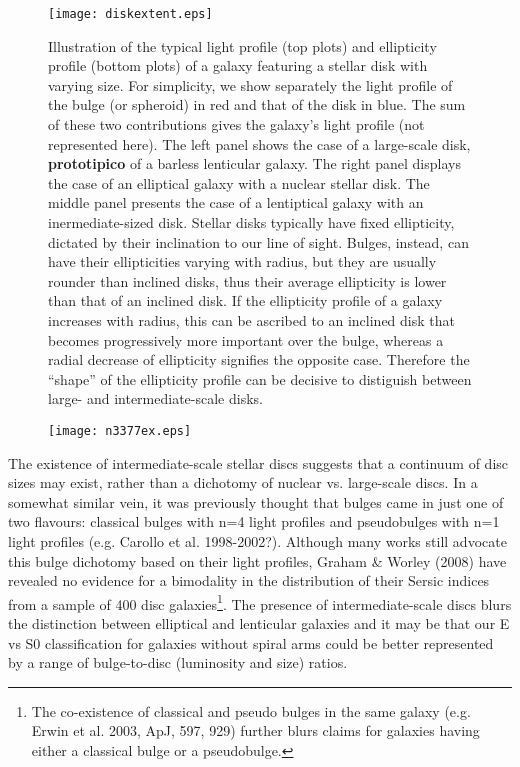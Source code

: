 \documentclass[preprint2]{emulateapj}
\begin{document}
\begin{figure}
\texttt{[image: diskextent.eps]}
\caption{Illustration of the typical light profile (top plots) and ellipticity profile (bottom plots) of a galaxy 
featuring a stellar disk with varying size. 
For simplicity, we show separately the light profile of the bulge (or spheroid) in red 
and that of the disk in blue. 
The sum of these two contributions gives the galaxy's light profile (not represented here).
The left panel shows the case of a large-scale disk, {\bf prototipico} of a barless lenticular galaxy. 
The right panel displays the case of an elliptical galaxy with a nuclear stellar disk. 
The middle panel presents the case of a lentiptical galaxy with an inermediate-sized disk. 
Stellar disks typically have fixed ellipticity, dictated by their inclination to our line of sight.
Bulges, instead, can have their ellipticities varying with radius,
but they are usually rounder than inclined disks, 
thus their average ellipticity is lower than that of an inclined disk.
If the ellipticity profile of a galaxy increases with radius, 
this can be ascribed to an inclined disk that becomes progressively more important over the bulge,
whereas a radial decrease of ellipticity signifies the opposite case. 
Therefore the ``shape'' of the ellipticity profile can be decisive to distiguish between 
large- and intermediate-scale disks. 
}
\label{fig:ellp}
\end{figure}

\begin{figure}
\texttt{[image: n3377ex.eps]}
\caption{
}
\label{fig:n3377ex}
\end{figure}

The existence of intermediate-scale stellar discs suggests that a continuum of disc sizes may exist, rather than a dichotomy of nuclear vs. large-scale discs.  
In a somewhat similar vein, it was previously thought that bulges came in just one of two flavours: 
classical bulges with n=4 light profiles and pseudobulges with n=1 light profiles (e.g. Carollo et al. 1998-2002?).  
Although many works still advocate this bulge dichotomy based on their light profiles, Graham \& Worley (2008) have revealed no 
evidence for a bimodality in the distribution of their Sersic indices from a sample of 400 disc 
galaxies\footnote{The co-existence of classical and pseudo bulges in the same galaxy (e.g. Erwin et al. 2003, ApJ, 597, 929) 
further blurs claims for galaxies having either a classical bulge or a pseudobulge.}.   
The presence of intermediate-scale discs blurs the distinction between elliptical and lenticular galaxies and it may be that our E vs S0 
classification for galaxies without spiral arms could be better represented by a range of bulge-to-disc (luminosity and size) ratios. 
\end{document}
